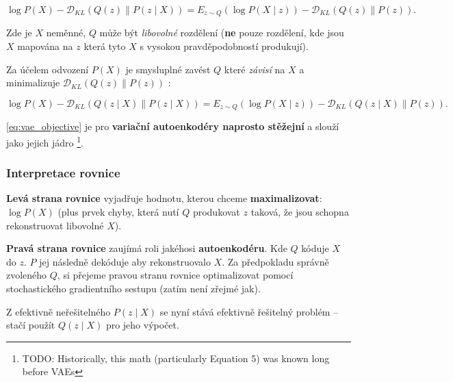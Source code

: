\begin{equation}
    \log P(X) - \mathcal{D}_{KL}(Q(z)\parallel P(z\mid X)) = E_{z \sim Q}(\log P(X\mid z)) - \mathcal{D}_{KL}(Q(z)\parallel P(z)).
\end{equation}

Zde je $X$ neměnné, $Q$ může být \emph{libovolné} rozdělení (\textbf{ne} pouze rozdělení, kde jsou $X$ mapována na $z$ která tyto $X$ s vysokou pravděpodobností produkují).

Za účelem odvození $P(X)$ je smysluplné zavést $Q$ které \emph{závisí} na $X$ a minimalizuje $\mathcal{D}_{KL}(Q(z)\parallel P(z))$ \cite{Doersch2021}:

\begin{equation} \label{eq:vae_objective}
    \log P(X) - \mathcal{D}_{KL}(Q(z \mid X)\parallel P(z\mid X)) = E_{z \sim Q}(\log P(X\mid z)) - \mathcal{D}_{KL}(Q(z\mid X)\parallel P(z)). 
\end{equation}

\autoref{eq:vae_objective} je pro \textbf{variační autoenkodéry naprosto stěžejní} a slouží jako jejich jádro \footnote{TODO: Historically, this math (particularly Equation 5) was known long before VAEs}. \cite{Doersch2021}


\subsubsection{Interpretace rovnice}
\textbf{Levá strana rovnice} vyjadřuje hodnotu, kterou chceme \textbf{maximalizovat}: $\log P(X)$ (plus prvek chyby, která nutí $Q$ produkovat $z$ taková, že jsou schopna rekonstruovat libovolné $X$). \cite{Doersch2021}

\textbf{Pravá strana rovnice} zaujímá roli jakéhosi \textbf{autoenkodéru}. Kde $Q$ kóduje $X$ do $z$. $P$ jej následně dekóduje aby rekonstruovalo $X$.
Za předpokladu správně zvoleného $Q$, si přejeme pravou stranu rovnice optimalizovat pomocí stochastického gradientního sestupu (zatím není zřejmé jak). \cite{Doersch2021}

Z efektivně neřešitelného $P(z\mid X)$ se nyní stává efektivně řešitelný problém – stačí použít $Q(z\mid X)$ pro jeho výpočet. \cite{Doersch2021}